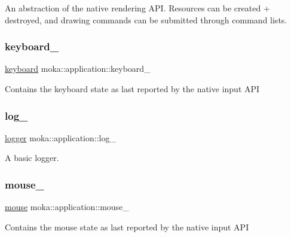 An abstraction of the native rendering A\+PI. Resources can be created + destroyed, and drawing commands can be submitted through command lists. \mbox{\label{classmoka_1_1application_ad7d5ace0349f00fb9df3760f61035ed8}} 
\subsubsection{\texorpdfstring{keyboard\_}{keyboard\_}}
{\footnotesize\ttfamily \mbox{\hyperlink{classmoka_1_1keyboard}{keyboard}} moka\+::application\+::keyboard\+\_\+\hspace{0.3cm}{\ttfamily [protected]}}

Contains the keyboard state as last reported by the native input A\+PI \mbox{\label{classmoka_1_1application_a4c0a7386e9592e03cf892e727773bf18}} 
\subsubsection{\texorpdfstring{log\_}{log\_}}
{\footnotesize\ttfamily \mbox{\hyperlink{classmoka_1_1logger}{logger}} moka\+::application\+::log\+\_\+\hspace{0.3cm}{\ttfamily [protected]}}

A basic logger. \mbox{\label{classmoka_1_1application_a0723c3d9d05b50e59fc67e523e64e831}} 
\subsubsection{\texorpdfstring{mouse\_}{mouse\_}}
{\footnotesize\ttfamily \mbox{\hyperlink{classmoka_1_1mouse}{mouse}} moka\+::application\+::mouse\+\_\+\hspace{0.3cm}{\ttfamily [protected]}}

Contains the mouse state as last reported by the native input A\+PI \mbox{\label{classmoka_1_1application_af888f59aa879423973a53500a4c12e1f}} 
